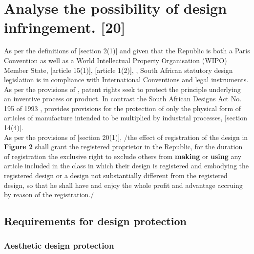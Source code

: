 \documentclass[11pt]{article}
\begin{document}
\section{Analyse the possibility of design infringement. [20]}
\label{sec:org360424b}

\cite{corbett84_homecraft_steel_v_sm_hare}

\cite{vdwesthuizen02_slavepak_v_buddy}

\cite{duplessis02_koninklijke_phillips_v_kenwood}

As per the definitions of [section 2(1)]\cite{rsa93_tm_act} and given that the
Republic is both a Paris Convention as well as a World Intellectual Property
Organisation (WIPO) Member State, [article 15(1)]\cite{wto17_trips}, [article
1(2)]\cite{wipo83_paris_conve_protect_ip}, \cite{wipo25_hague_agreement}, South African statutory design
legislation is in compliance with International Conventions and legal instruments.\\

As per the provisions of \cite{rsa78_patents_act}, patent rights seek to protect
the principle underlying an inventive process or product. In contrast the South
African Designs Act No. 195 of 1993 \cite{rsa93_designs_act}, provides provisions
for the protection of only the physical form of articles of manufacture intended
to be multiplied by industrial processes, [section
14(4)]\cite{rsa93_designs_act}.\\

As per the provisions of [section 20(1)]\cite{rsa93_designs_act}, /the effect of
registration of the design in \textbf{Figure 2} shall grant the registered proprietor
in the Republic, for the duration of registration the exclusive right to exclude
others from \textbf{making} or \textbf{using} any article included in the class in which their
design is registered and embodying the registered design or a design not
substantially different from the registered design, so that he shall have and
enjoy the whole profit and advantage accruing by reason of the registration./


\subsection{Requirements for design protection}
\label{sec:org1303ca4}
\subsubsection{Aesthetic design protection}
\label{sec:org06954a6}
\end{document}
